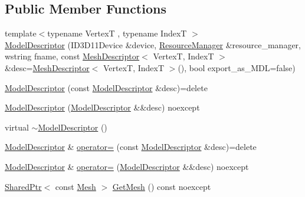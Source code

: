 \subsection*{Public Member Functions}
\begin{DoxyCompactItemize}
\item 
{\footnotesize template$<$typename VertexT , typename IndexT $>$ }\\\mbox{\hyperlink{classmage_1_1rendering_1_1_model_descriptor_aa27c73a72219352647cd31ddfd6e64d6}{Model\+Descriptor}} (I\+D3\+D11\+Device \&device, \mbox{\hyperlink{classmage_1_1rendering_1_1_resource_manager}{Resource\+Manager}} \&resource\+\_\+manager, wstring fname, const \mbox{\hyperlink{classmage_1_1rendering_1_1_mesh_descriptor}{Mesh\+Descriptor}}$<$ VertexT, IndexT $>$ \&desc=\mbox{\hyperlink{classmage_1_1rendering_1_1_mesh_descriptor}{Mesh\+Descriptor}}$<$ VertexT, IndexT $>$(), bool export\+\_\+as\+\_\+\+M\+DL=false)
\item 
\mbox{\hyperlink{classmage_1_1rendering_1_1_model_descriptor_af3fc0dea0060aa15a8003a7f4f807dd0}{Model\+Descriptor}} (const \mbox{\hyperlink{classmage_1_1rendering_1_1_model_descriptor}{Model\+Descriptor}} \&desc)=delete
\item 
\mbox{\hyperlink{classmage_1_1rendering_1_1_model_descriptor_a0e7a576be083c9499a074cfd39acbcb7}{Model\+Descriptor}} (\mbox{\hyperlink{classmage_1_1rendering_1_1_model_descriptor}{Model\+Descriptor}} \&\&desc) noexcept
\item 
virtual \mbox{\hyperlink{classmage_1_1rendering_1_1_model_descriptor_adef21799bc748828e8e04bc74f86aac0}{$\sim$\+Model\+Descriptor}} ()
\item 
\mbox{\hyperlink{classmage_1_1rendering_1_1_model_descriptor}{Model\+Descriptor}} \& \mbox{\hyperlink{classmage_1_1rendering_1_1_model_descriptor_a6d27a72aa2ebffbe4e7f2635f803dd72}{operator=}} (const \mbox{\hyperlink{classmage_1_1rendering_1_1_model_descriptor}{Model\+Descriptor}} \&desc)=delete
\item 
\mbox{\hyperlink{classmage_1_1rendering_1_1_model_descriptor}{Model\+Descriptor}} \& \mbox{\hyperlink{classmage_1_1rendering_1_1_model_descriptor_a52e9fbf292efc7a803d367bb3b6cb962}{operator=}} (\mbox{\hyperlink{classmage_1_1rendering_1_1_model_descriptor}{Model\+Descriptor}} \&\&desc) noexcept
\item 
\mbox{\hyperlink{namespacemage_a1e01ae66713838a7a67d30e44c67703e}{Shared\+Ptr}}$<$ const \mbox{\hyperlink{classmage_1_1rendering_1_1_mesh}{Mesh}} $>$ \mbox{\hyperlink{classmage_1_1rendering_1_1_model_descriptor_a65645313d8b7bb976d1b5d0acdbbd38a}{Get\+Mesh}} () const noexcept

\end{DoxyCompactItemize}
